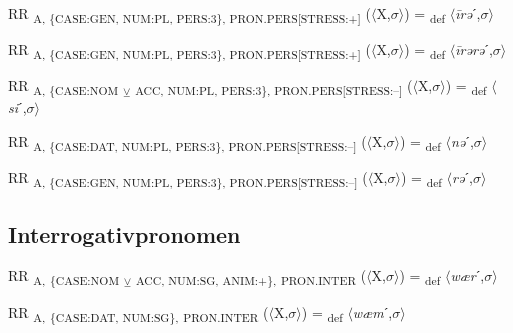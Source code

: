 {\begin{exe}
 RR \textsubscript{A, \{CASE:GEN, NUM:PL, PERS:3\}, PRON.PERS[STRESS:+]} ($\langle$X,$\sigma $$\rangle$) = \textsubscript{def} $\langle$\textit{\=irə}ˊ,$\sigma $$\rangle$
\end{exe}

\begin{exe}
 RR \textsubscript{A, \{CASE:GEN, NUM:PL, PERS:3\}, PRON.PERS[STRESS:+]} ($\langle$X,$\sigma $$\rangle$) = \textsubscript{def} $\langle$\textit{\=irərə}ˊ,$\sigma $$\rangle$
\end{exe}

\begin{exe}
 RR \textsubscript{A, \{CASE:NOM} \textsubscript{${\veebar}$}\textsubscript{ ACC, NUM:PL, PERS:3\}, PRON.PERS[STRESS:–]} ($\langle$X,$\sigma $$\rangle$) = \textsubscript{def} $\langle$\textit{si}ˊ,$\sigma $$\rangle$
\end{exe}

\begin{exe}
 RR \textsubscript{A, \{CASE:DAT, NUM:PL, PERS:3\}, PRON.PERS[STRESS:–]} ($\langle$X,$\sigma $$\rangle$) = \textsubscript{def} $\langle$\textit{nə}ˊ,$\sigma $$\rangle$
\end{exe}

\begin{exe}
 RR \textsubscript{A, \{CASE:GEN, NUM:PL, PERS:3\}, PRON.PERS[STRESS:–]} ($\langle$X,$\sigma $$\rangle$) = \textsubscript{def} $\langle$\textit{rə}ˊ,$\sigma $$\rangle$
\end{exe}

\subsection{Interrogativpronomen}

\begin{exe}
 RR \textsubscript{A,} \textsubscript{\{CASE:NOM} \textsubscript{${\veebar}$}\textsubscript{ ACC, NUM:SG, ANIM:+\},} \textsubscript{PRON.INTER} ($\langle$X,$\sigma $$\rangle$) = \textsubscript{def} $\langle$\textit{wær}ˊ,$\sigma $$\rangle$
\end{exe}

\begin{exe}
 RR \textsubscript{A,} \textsubscript{\{CASE:DAT, NUM:SG\},} \textsubscript{PRON.INTER} ($\langle$X,$\sigma $$\rangle$) = \textsubscript{def} $\langle$\textit{wæm}ˊ,$\sigma $$\rangle$
\end{exe}

}
